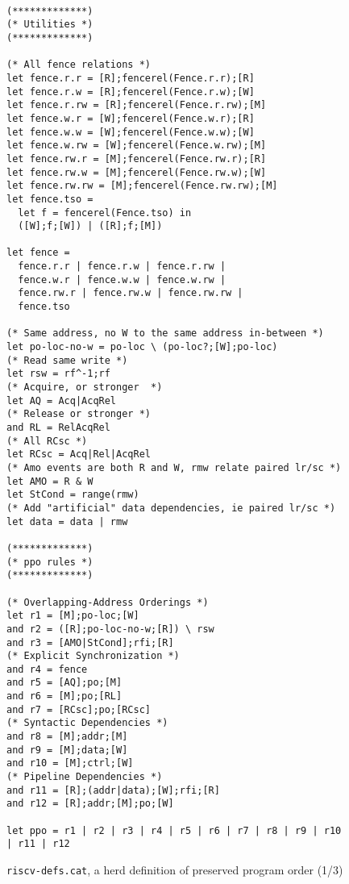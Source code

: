 \begin{figure}[h!]
  {
  \tt\bfseries\centering\footnotesize
  \begin{lstlisting}
(*************)
(* Utilities *)
(*************)

(* All fence relations *)
let fence.r.r = [R];fencerel(Fence.r.r);[R]
let fence.r.w = [R];fencerel(Fence.r.w);[W]
let fence.r.rw = [R];fencerel(Fence.r.rw);[M]
let fence.w.r = [W];fencerel(Fence.w.r);[R]
let fence.w.w = [W];fencerel(Fence.w.w);[W]
let fence.w.rw = [W];fencerel(Fence.w.rw);[M]
let fence.rw.r = [M];fencerel(Fence.rw.r);[R]
let fence.rw.w = [M];fencerel(Fence.rw.w);[W]
let fence.rw.rw = [M];fencerel(Fence.rw.rw);[M]
let fence.tso =
  let f = fencerel(Fence.tso) in
  ([W];f;[W]) | ([R];f;[M])

let fence = 
  fence.r.r | fence.r.w | fence.r.rw |
  fence.w.r | fence.w.w | fence.w.rw |
  fence.rw.r | fence.rw.w | fence.rw.rw |
  fence.tso

(* Same address, no W to the same address in-between *)
let po-loc-no-w = po-loc \ (po-loc?;[W];po-loc)
(* Read same write *)
let rsw = rf^-1;rf
(* Acquire, or stronger  *)
let AQ = Acq|AcqRel
(* Release or stronger *)
and RL = RelAcqRel
(* All RCsc *)
let RCsc = Acq|Rel|AcqRel
(* Amo events are both R and W, rmw relate paired lr/sc *)
let AMO = R & W
let StCond = range(rmw)
(* Add "artificial" data dependencies, ie paired lr/sc *)
let data = data | rmw

(*************)
(* ppo rules *)
(*************)

(* Overlapping-Address Orderings *)
let r1 = [M];po-loc;[W]
and r2 = ([R];po-loc-no-w;[R]) \ rsw
and r3 = [AMO|StCond];rfi;[R]
(* Explicit Synchronization *)
and r4 = fence
and r5 = [AQ];po;[M]
and r6 = [M];po;[RL]
and r7 = [RCsc];po;[RCsc]
(* Syntactic Dependencies *)
and r8 = [M];addr;[M]
and r9 = [M];data;[W]
and r10 = [M];ctrl;[W]
(* Pipeline Dependencies *)
and r11 = [R];(addr|data);[W];rfi;[R]
and r12 = [R];addr;[M];po;[W]

let ppo = r1 | r2 | r3 | r4 | r5 | r6 | r7 | r8 | r9 | r10 | r11 | r12
\end{lstlisting}
  }
  \caption{{\tt riscv-defs.cat}, a herd definition of preserved program order (1/3)}
  \label{fig:herd1}
\end{figure}

